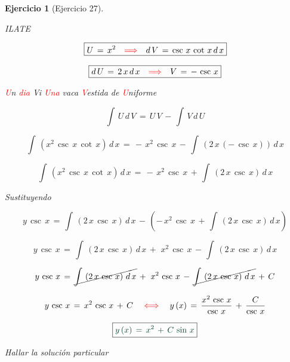 \documentclass[a4paper,11pt]{book}
\newtheorem{ejer}{Ejercicio}[section]
\begin{document}
\begin{ejer}[Ejercicio 27]
\begin{tcolorbox}[colback=red!5!white,colframe=red!75!black,fonttitle=\bfseries,title=$I_{2}$]
ILATE 

  

$$\boxed{U\,=\,x^{2} \quad \textcolor{red}{\Longrightarrow} \quad d\,V\,=\,\csc\,x\,\cot\,x\,d\,x }$$ 

  

$$\boxed{d\,U\,=\,2\,x\,d\,x \quad \textcolor{red}{\Longrightarrow} \quad V\,=\,-\,\csc\,x }$$ 

 


\textcolor{red}{U}n \textcolor{red}{dia} Vi \textcolor{red}{Una} vaca \textcolor{red}{V}estida de \textcolor{red}{U}niforme      



  

$$\int\,U\,d\,V\,=\,U\,V\,-\,\int\,V\,d\,U$$ 

  

$$\int\,\left(x^{2}\,\csc\,x\,\cot\,x \right)\,d\,x\,=\,-\,x^{2}\,\csc\,x\,-\,\int\,\left(2\,x\,(-\,\csc\,x) \right)\,d\,x$$ 

  

$$\boxed{\int\,\left(x^{2}\,\csc\,x\,\cot\,x \right)\,d\,x\,=\,-\,x^{2}\,\csc\,x\,+\,\int\,\left(2\,x\,\csc\,x \right)\,d\,x}$$ 

  

\end{tcolorbox} 

  

Sustituyendo 

  

$$y\,\csc\,x\,=\,\int\,\left( 2\,x\,\csc\,x \right)\,d\,x\,-\,\left(-\,x^{2}\,\csc\,x\,+\,\int\,\left(2\,x\,\csc\,x \right)\,d\,x \right)$$ 

  

$$y\,\csc\,x\,=\,\int\,\left( 2\,x\,\csc\,x \right)\,d\,x\,+\,\,x^{2}\,\csc\,x\,-\,\int\,\left(2\,x\,\csc\,x \right)\,d\,x $$ 

  

$$y\,\csc\,x\,=\,\cancel{\int\,\left( 2\,x\,\csc\,x \right)\,d\,x}\,+\,\,x^{2}\,\csc\,x\,-\,\cancel{\int\,\left(2\,x\,\csc\,x \right)\,d\,x}\,+\,C $$ 

  

$$y\,\csc\,x\,=\,x^{2}\,\csc\,x\,+\,C\quad \textcolor{red}{\iff} \quad y\,(x)\,=\,\dfrac{x^{2}\,\csc\,x}{\csc\,x}\,+\,\dfrac{C}{\csc\,x}$$ 

  

$$\boxed{\textcolor{britishracinggreen}{y\,(x)\,=\,x^{2}\,+\,C\,\sin\,x}}$$ 

  

 Hallar la solución particular 


\end{ejer}
\end{document}
